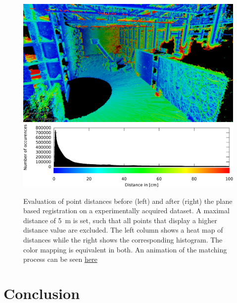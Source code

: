 \documentclass[5p]{elsarticle}
\begin{document}
	\begin{figure}
		\centering
		\begin{minipage}[c]{0.25\textwidth}
			\centering	
			\includegraphics[width = \textwidth]{./images/distances_fire}\\
			\includegraphics[width = \textwidth]{./images/histogram_fire}
	  	\end{minipage}\hfill
	  	\begin{minipage}[c]{0.25\textwidth}
	  	\end{minipage} 	

		\caption{Evaluation of point distances before (left) and after (right) the plane based registration on a experimentally acquired dataset. A maximal distance of \SI{5}{m} is set, such that all points that display a higher distance value are excluded. The left column shows a heat map of distances while the right shows the corresponding histogram. The color mapping is equivalent in both. An animation of the matching process can be seen \href{todo}{here}}
		\label{fig:experimentalEvaluation}
	\end{figure}
\fi

\section{Conclusion}
\end{document}
